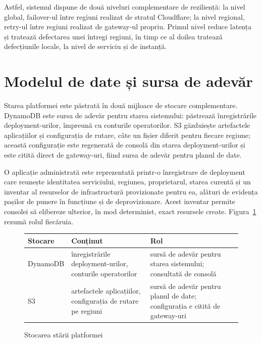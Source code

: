 \documentclass[12pt,a4paper]{report}
\begin{document}
Astfel, sistemul dispune de două niveluri complementare de reziliență: la nivel global, failover-ul între regiuni realizat de stratul Cloudflare; la nivel regional, retry-ul între regiuni realizat de gateway-ul propriu. Primul nivel reduce latența și tratează defectarea unei întregi regiuni, în timp ce al doilea tratează defecțiunile locale, la nivel de serviciu și de instanță.

\section{Modelul de date și sursa de adevăr}
Starea platformei este păstrată în două mijloace de stocare complementare. DynamoDB este sursa de adevăr pentru starea sistemului: păstrează înregistrările deployment-urilor, împreună cu conturile operatorilor. S3 găzduiește artefactele aplicațiilor și configurația de rutare, câte un fișier diferit pentru fiecare regiune; această configurație este regenerată de consolă din starea deployment-urilor și este citită direct de gateway-uri, fiind sursa de adevăr pentru planul de date.

O aplicație administrată este reprezentată printr-o înregistrare de deployment care reunește identitatea serviciului, regiunea, proprietarul, starea curentă și un inventar al resurselor de infrastructură provizionate pentru ea, alături de evidența pașilor de punere în funcțiune și de deprovizionare. Acest inventar permite consolei să elibereze ulterior, în mod determinist, exact resursele create. Figura~\ref{tab:date} rezumă rolul fiecăruia.

\begin{figure}[H]
\centering
\small\linespread{1.1}
\begin{tabular}{@{}>{\raggedright\arraybackslash}p{3cm}
                   >{\raggedright\arraybackslash}p{4.8cm}
                   >{\raggedright\arraybackslash}p{4.8cm}@{}}
\toprule
\textbf{Stocare} & \textbf{Conținut} & \textbf{Rol} \\
\midrule
DynamoDB & înregistrările deployment-urilor, conturile operatorilor & sursă de adevăr pentru starea sistemului; consultată de consolă \\
\addlinespace
S3 & artefactele aplicațiilor, configurația de rutare pe regiuni & sursă de adevăr pentru planul de date; configurația e citită de gateway-uri \\
\bottomrule
\end{tabular}
\vspace{4pt}
\caption{Stocarea stării platformei}
\label{tab:date}
\end{figure}
\end{document}
